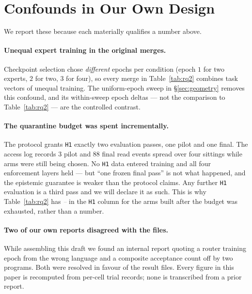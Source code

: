 \documentclass[sigconf,review,anonymous]{acmart}
\newcommand{\pending}{\textcolor{gray}{\textit{--}}}
\newcommand{\cond}[1]{\texttt{#1}}
\begin{document}
\section{Confounds in Our Own Design}
\label{sec:confounds}

We report these because each materially qualifies a number above.

\paragraph{Unequal expert training in the original merges.} Checkpoint selection chose
\emph{different} epochs per condition (epoch $1$ for two experts, $2$ for two, $3$ for four), so
every merge in Table~\ref{tab:rq2} combines task vectors of unequal training. The uniform-epoch
sweep in \S\ref{sec:geometry} removes this confound, and its within-sweep epoch deltas --- not
the comparison to Table~\ref{tab:rq2} --- are the controlled contrast.

\paragraph{The quarantine budget was spent incrementally.} The protocol grants \cond{H1} exactly
two evaluation passes, one pilot and one final. The access log records $3$ pilot and $88$ final
read events spread over four sittings while arms were still being chosen. No \cond{H1} data
entered training and all four enforcement layers held --- but ``one frozen final pass'' is not
what happened, and the epistemic guarantee is weaker than the protocol claims. Any further
\cond{H1} evaluation is a third pass and we will declare it as such. This is why
Table~\ref{tab:rq2} has \pending{} in the \cond{H1} column for the arms built after the budget
was exhausted, rather than a number.

\paragraph{Two of our own reports disagreed with the files.} While assembling this draft we
found an internal report quoting a router training epoch from the wrong language and a composite
acceptance count off by two programs. Both were resolved in favour of the result files.
Every figure in this paper is recomputed from per-cell trial records; none is transcribed from a
prior report.

\end{document}
